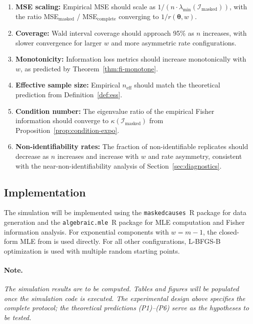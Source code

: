 \documentclass[11pt]{article}
\theoremstyle{definition}
\theoremstyle{plain}
\renewcommand{\v}[1]{\boldsymbol{#1}}
\newcommand{\btheta}{\v{\theta}}
\newcommand{\FI}{\mathcal{I}}       %
\begin{document}
\begin{enumerate}[label=(P\arabic*)]
    \item \textbf{MSE scaling:} Empirical MSE should scale as
    $1/(n \cdot \lambda_{\min}(\FI_{\mathrm{masked}}))$, with the
    ratio MSE$_{\mathrm{masked}}$ / MSE$_{\mathrm{complete}}$
    converging to $1/r(\btheta, w)$.
    \item \textbf{Coverage:} Wald interval coverage should approach
    95\% as $n$ increases, with slower convergence for larger $w$
    and more asymmetric rate configurations.
    \item \textbf{Monotonicity:} Information loss metrics should
    increase monotonically with $w$, as predicted by
    Theorem~\ref{thm:fi-monotone}.
    \item \textbf{Effective sample size:} Empirical
    $n_{\mathrm{eff}}$ should match the theoretical prediction
    from Definition~\ref{def:ess}.
    \item \textbf{Condition number:} The eigenvalue ratio of the
    empirical Fisher information should converge to
    $\kappa(\FI_{\mathrm{masked}})$ from
    Proposition~\ref{prop:condition-expo}.
    \item \textbf{Non-identifiability rates:} The fraction of
    non-identifiable replicates should decrease as $n$ increases
    and increase with $w$ and rate asymmetry, consistent with
    the near-non-identifiability analysis of Section~\ref{sec:diagnostics}.
\end{enumerate}

\subsection{Implementation}

The simulation will be implemented using the
\texttt{maskedcauses}~R package \citep{towell2025maskedcauses}
for data generation and the
\texttt{algebraic.mle}~R package \citep{towell2023algebraicmle}
for MLE computation and Fisher information analysis.
For exponential components with $w = m - 1$, the closed-form MLE
from \citet{towell2026exponential} is used directly.
For all other configurations, L-BFGS-B optimization
\citep{byrd1995} is used with multiple random starting points.

\paragraph{Note.}
\emph{The simulation results are to be computed.
Tables and figures will be populated once the simulation code is
executed.
The experimental design above specifies the complete protocol;
the theoretical predictions (P1)--(P6) serve as the hypotheses
to be tested.}
\end{document}
